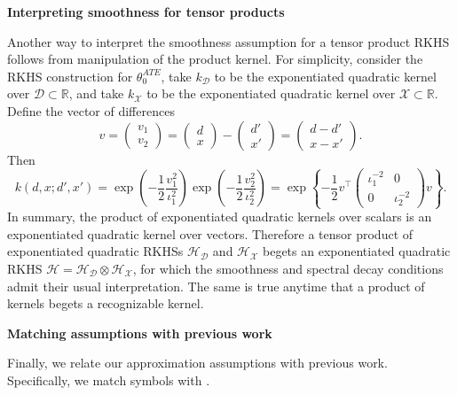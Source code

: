 \textbf{Interpreting smoothness for tensor products}

Another way to interpret the smoothness assumption for a tensor product RKHS follows from manipulation of the product kernel. For simplicity, consider the RKHS construction for $\theta_0^{ATE}$, take $k_{\mathcal{D}}$ to be the exponentiated quadratic kernel over $\mathcal{D}\subset\mathbb{R}$, and take $k_{\mathcal{X}}$ to be the exponentiated quadratic kernel over $\mathcal{X}\subset\mathbb{R}$. Define the vector of differences 
$$
v
=\begin{pmatrix} v_1 \\ v_2 \end{pmatrix}=\begin{pmatrix} d \\ x \end{pmatrix} - \begin{pmatrix} d' \\ x' \end{pmatrix} =\begin{pmatrix} d-d' \\ x-x' \end{pmatrix}. $$ 
Then $$
k(d,x;d',x')
=\exp\left(-\frac{1}{2}\frac{v_1^2}{\iota_1^2}\right)
\exp\left(-\frac{1}{2}\frac{v_2^2}{\iota_2^2}\right)
=\exp\left\{-\frac{1}{2}v^{\top} \begin{pmatrix}\iota_1^{-2} & 0 \\ 0 & \iota_2^{-2}\end{pmatrix}  v  \right\}.
$$
In summary, the product of exponentiated quadratic kernels over scalars is an exponentiated quadratic kernel over vectors. Therefore a tensor product of exponentiated quadratic RKHSs $\mathcal{H}_{\mathcal{D}}$ and $\mathcal{H}_{\mathcal{X}}$ begets an exponentiated quadratic RKHS $\mathcal{H}=\mathcal{H}_{\mathcal{D}} \otimes \mathcal{H}_{\mathcal{X}}$, for which the smoothness and spectral decay conditions admit their usual interpretation. The same is true anytime that a product of kernels begets a recognizable kernel.

\textbf{Matching assumptions with previous work}

Finally, we relate our approximation assumptions with previous work. Specifically, we match symbols with \cite{fischer2017sobolev}.

